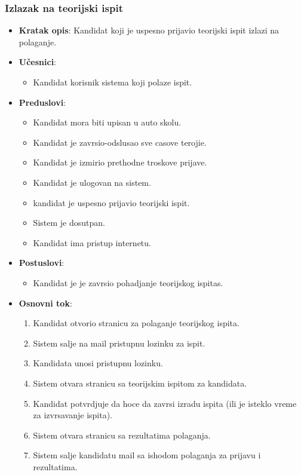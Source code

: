 \subsubsection{Izlazak na teorijski ispit}
\label{subsubsec:teorijski ispit}
\begin{itemize}
  \item \textbf{Kratak opis}: Kandidat koji je uspesno prijavio teorijski ispit izlazi na polaganje.
  \item \textbf{Učesnici}:
    \begin{itemize}
    \item Kandidat korisnik sistema koji polaze ispit.
    \end{itemize}
  \item \textbf{Preduslovi}:
    \begin{itemize}
    \item  Kandidat mora biti upisan u auto skolu.
    \item  Kandidat je zavrsio-odslusao sve casove terojie.
    \item  Kandidat je izmirio prethodne troskove prijave.
    \item  Kandidat je ulogovan na sistem.
    \item  kandidat je uspesno prijavio teorijski ispit.
    \item  Sistem je dosutpan.
    \item  Kandidat ima pristup internetu.
    \end{itemize}
  \item \textbf{Postuslovi}:
      \begin{itemize}
      \item  Kandidat je je zavrsio pohadjanje teorijskog ispitas.
      \end{itemize}
  \item \textbf{Osnovni tok}:
      \begin{enumerate}
        \item Kandidat otvorio stranicu za polaganje teorijskog ispita.
        \item Sistem salje na mail pristupnu lozinku za ispit.
        \item Kandidata unosi pristupnu lozinku.
        \item Sistem otvara stranicu sa teorijskim ispitom za kandidata.
        \item Kandidat potvrdjuje da hoce da zavrsi izradu ispita (ili je isteklo vreme za izvrsavanje ispita).
        \item Sistem otvara stranicu sa rezultatima polaganja.
        \item Sistem salje kandidatu mail sa ishodom polaganja za prijavu i rezultatima.
      \end{enumerate}


\end{itemize}
